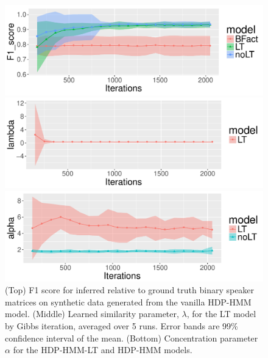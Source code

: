 \begin{figure}[tb]
\vskip 0.2in
\begin{center}
  \centerline{\includegraphics[width = \columnwidth]{fig/synth16/F1_score.pdf}}
  \centerline{\includegraphics[width = \columnwidth]{fig/synth16/lambda.pdf}}
  \centerline{\includegraphics[width = \columnwidth]{fig/synth16/alpha.pdf}}
\caption{(Top) F1 score for inferred relative to ground
  truth binary speaker matrices on synthetic data generated from the
  vanilla HDP-HMM model. (Middle) Learned similarity parameter, $\lambda$, for the LT
  model by Gibbs iteration, averaged over 5 runs.  Error bands are
  99\% confidence interval of the mean.  (Bottom) Concentration
  parameter $\alpha$ for the HDP-HMM-LT and HDP-HMM models.}
\end{center}
\label{fig:synthetic-metrics}
\vskip 0.2in
\end{figure}


